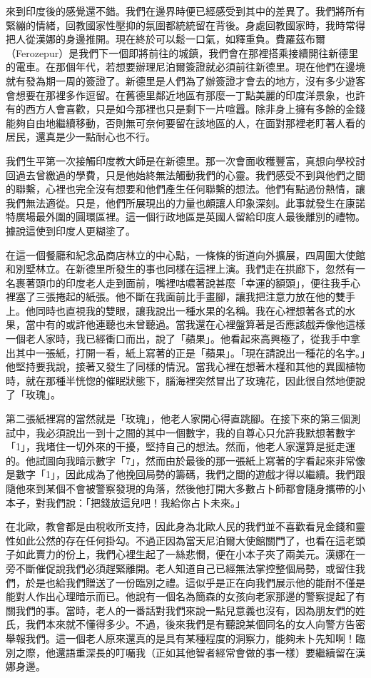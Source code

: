 來到印度後的感覺還不錯。我們在邊界時便已經感受到其中的差異了。我們將所有緊繃的情緒，回教國家性壓抑的氛圍都統統留在背後。身處回教國家時，我時常得把人從漢娜的身邊推開。現在終於可以鬆一口氣，如釋重負。費羅茲布爾（Ferozepur）是我們下一個即將前往的城鎮，我們會在那裡搭乘接續開往新德里的電車。在那個年代，若想要辦理尼泊爾簽證就必須前往新德里。現在他們在邊境就有發為期一周的簽證了。新德里是人們為了辦簽證才會去的地方，沒有多少遊客會想要在那裡多作逗留。在舊德里鄰近地區有那麼一丁點美麗的印度洋景象，也許有的西方人會喜歡，只是如今那裡也只是剩下一片喧囂。除非身上擁有多餘的金錢能夠自由地繼續移動，否則無可奈何要留在該地區的人，在面對那裡老盯著人看的居民，還真是少一點耐心也不行。

我們生平第一次接觸印度教大師是在新德里。那一次會面收穫豐富，真想向學校討回過去曾繳過的學費，只是他始終無法觸動我們的心靈。我們感受不到與他們之間的聯繫，心裡也完全沒有想要和他們產生任何聯繫的想法。他們有點過份熱情，讓我們無法適從。只是，他們所展現出的力量也頗讓人印象深刻。此事就發生在康諾特廣場最外圍的圓環區裡。這一個行政地區是英國人留給印度人最後離別的禮物。據說這使到印度人更糊塗了。

在這一個餐廳和紀念品商店林立的中心點，一條條的街道向外擴展，四周圍大使館和別墅林立。在新德里所發生的事也同樣在這裡上演。我們走在拱廊下，忽然有一名裹著頭巾的印度老人走到面前，嘴裡咕噥著說甚麼「幸運的額頭」，便往我手心裡塞了三張捲起的紙張。他不斷在我面前比手畫腳，讓我把注意力放在他的雙手上。他同時也直視我的雙眼，讓我說出一種水果的名稱。我在心裡想著各式的水果，當中有的或許他連聽也未曾聽過。當我還在心裡盤算著是否應該戲弄像他這樣一個老人家時，我已經衝口而出，說了「蘋果」。他看起來高興極了，從我手中拿出其中一張紙，打開一看，紙上寫著的正是「蘋果」。「現在請說出一種花的名字。」他堅持要我說，接著又發生了同樣的情況。當我心裡在想著木槿和其他的異國植物時，就在那種半恍惚的催眠狀態下，腦海裡突然冒出了玫瑰花，因此很自然地便說了「玫瑰」。

第二張紙裡寫的當然就是「玫瑰」，他老人家開心得直跳腳。在接下來的第三個測試中，我必須說出一到十之間的其中一個數字，我的自尊心只允許我默想著數字「1」，我堵住一切外來的干擾，堅持自己的想法。然而，他老人家還算是挺走運的。他試圖向我暗示數字「7」，然而由於最後的那一張紙上寫著的字看起來非常像是數字「1」，因此成為了他挽回局勢的籌碼，我們之間的遊戲才得以繼續。我們跟隨他來到某個不會被警察發現的角落，然後他打開大多數占卜師都會隨身攜帶的小本子，對我們說：「把錢放這兒吧！我給你占卜未來。」

在北歐，教會都是由稅收所支持，因此身為北歐人民的我們並不喜歡看見金錢和靈性如此公然的存在任何掛勾。不過正因為當天尼泊爾大使館關門了，也看在這老頭子如此賣力的份上，我們心裡生起了一絲悲憫，便在小本子夾了兩美元。漢娜在一旁不斷催促說我們必須趕緊離開。老人知道自己已經無法掌控整個局勢，或留住我們，於是也給我們贈送了一份臨別之禮。這似乎是正在向我們展示他的能耐不僅是能對人作出心理暗示而已。他說有一個名為簡森的女孩向老家那邊的警察提起了有關我們的事。當時，老人的一番話對我們來說一點兒意義也沒有，因為朋友們的姓氏，我們本來就不懂得多少。不過，後來我們是有聽說某個同名的女人向警方告密舉報我們。這一個老人原來還真的是具有某種程度的洞察力，能夠未卜先知啊！臨別之際，他還語重深長的叮囑我（正如其他智者經常會做的事一樣）要繼續留在漢娜身邊。

